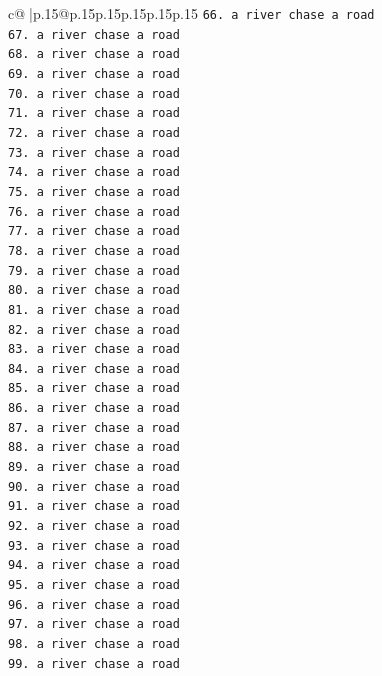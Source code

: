 \documentclass{article}
\begin{document}
{\begin{supertabular}{c@{$\;$}|p{.15\linewidth}@{}p{.15\linewidth}p{.15\linewidth}p{.15\linewidth}p{.15\linewidth}p{.15\linewidth}}
{{{\texttt{66. a river chase a road} \\
\texttt{67. a river chase a road} \\
\texttt{68. a river chase a road} \\
\texttt{69. a river chase a road} \\
\texttt{70. a river chase a road} \\
\texttt{71. a river chase a road} \\
\texttt{72. a river chase a road} \\
\texttt{73. a river chase a road} \\
\texttt{74. a river chase a road} \\
\texttt{75. a river chase a road} \\
\texttt{76. a river chase a road} \\
\texttt{77. a river chase a road} \\
\texttt{78. a river chase a road} \\
\texttt{79. a river chase a road} \\
\texttt{80. a river chase a road} \\
\texttt{81. a river chase a road} \\
\texttt{82. a river chase a road} \\
\texttt{83. a river chase a road} \\
\texttt{84. a river chase a road} \\
\texttt{85. a river chase a road} \\
\texttt{86. a river chase a road} \\
\texttt{87. a river chase a road} \\
\texttt{88. a river chase a road} \\
\texttt{89. a river chase a road} \\
\texttt{90. a river chase a road} \\
\texttt{91. a river chase a road} \\
\texttt{92. a river chase a road} \\
\texttt{93. a river chase a road} \\
\texttt{94. a river chase a road} \\
\texttt{95. a river chase a road} \\
\texttt{96. a river chase a road} \\
\texttt{97. a river chase a road} \\
\texttt{98. a river chase a road} \\
\texttt{99. a river chase a road} \\
}}}
\end{supertabular}}
\end{document}
